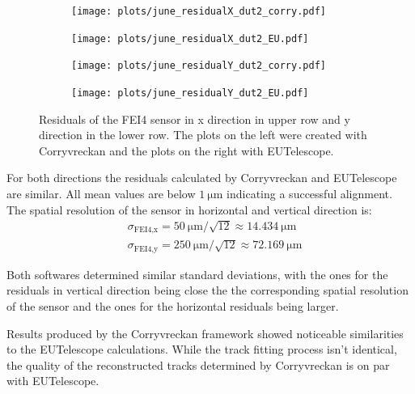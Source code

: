 \begin{figure}
  \hspace{-2.5cm}
  \begin{subfigure}{0.62\textwidth}
      \texttt{[image: plots/june\_residualX\_dut2\_corry.pdf]}
  \end{subfigure}
  \begin{subfigure}{0.62\textwidth}
      \hspace{0.95cm}
      \texttt{[image: plots/june\_residualX\_dut2\_EU.pdf]}
  \end{subfigure}
  \begin{subfigure}{0.62\textwidth}
    \hspace{-2.5cm}
      \texttt{[image: plots/june\_residualY\_dut2\_corry.pdf]}
  \end{subfigure}
  \begin{subfigure}{0.62\textwidth}
    \hspace{-2.5cm}
      \hspace{0.95cm}
      \texttt{[image: plots/june\_residualY\_dut2\_EU.pdf]}
  \end{subfigure}
  \caption{Residuals of the FEI4 sensor in x direction in upper row and y direction in the lower row. The plots on the left
  were created with Corryvreckan and the plots on the right with EUTelescope.}
  \label{fig:residual_dut}
\end{figure}

For both directions the residuals calculated by Corryvreckan and EUTelescope are similar. All mean values are below $\SI{1}{\micro\meter}$
indicating a successful alignment. The spatial resolution of the sensor in horizontal and vertical direction is:
\begin{align*}
  &\sigma_{\text{FEI4},\text{x}} = \SI{50}{\micro\meter}/\sqrt{12} \approx \SI{14.434}{\micro\meter} \\
  &\sigma_{\text{FEI4},\text{y}} = \SI{250}{\micro\meter}/\sqrt{12} \approx \SI{72.169}{\micro\meter}
\end{align*}

Both softwares determined similar standard deviations, with the ones for the residuals in vertical direction being close the
the corresponding spatial resolution of the sensor and the ones for the horizontal residuals being larger.



Results produced by the Corryvreckan framework showed noticeable similarities to the EUTelescope calculations. While the track
fitting process isn't identical, the quality of the reconstructed tracks determined by Corryvreckan is on par with EUTelescope.
